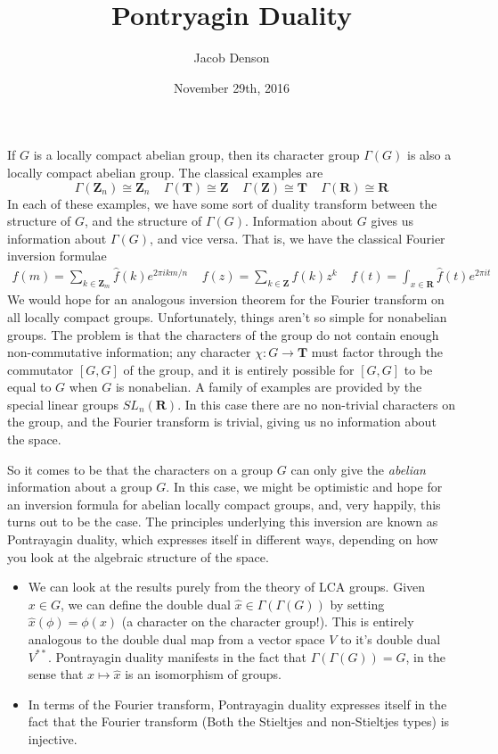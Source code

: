 \documentclass{article}
\title{Pontryagin Duality}
\author{Jacob Denson}
\date{November 29th, 2016}
\theoremstyle{plain}
\theoremstyle{definition}
\begin{document}
\maketitle

If $G$ is a locally compact abelian group, then its character group $\Gamma(G)$ is also a locally compact abelian group. The classical examples are
%
\[ \Gamma(\mathbf{Z}_n) \cong \mathbf{Z}_n\ \ \ \ \ \Gamma(\mathbf{T}) \cong \mathbf{Z}\ \ \ \ \ \Gamma(\mathbf{Z}) \cong \mathbf{T}\ \ \ \ \ \Gamma(\mathbf{R}) \cong \mathbf{R} \]
%
In each of these examples, we have some sort of duality transform between the structure of $G$, and the structure of $\Gamma(G)$. Information about $G$ gives us information about $\Gamma(G)$, and vice versa. That is, we have the classical Fourier inversion formulae
%
\begin{align*}
    f(m) = \sum_{k \in \mathbf{Z}_m} \widehat{f}(k) e^{2 \pi i km/n}\ \ \ \ \ f(z) = \sum_{k \in \mathbf{Z}} \widehat{f}(k) z^k\ \ \ \ \ f(t) = \int_{x \in \mathbf{R}} \widehat{f}(t) e^{2 \pi i t}
\end{align*}
%
We would hope for an analogous inversion theorem for the Fourier transform on all locally compact groups. Unfortunately, things aren't so simple for nonabelian groups. The problem is that the characters of the group do not contain enough non-commutative information; any character $\chi: G \to \mathbf{T}$ must factor through the commutator $[G,G]$ of the group, and it is entirely possible for $[G,G]$ to be equal to $G$ when $G$ is nonabelian. A family of examples are provided by the special linear groups $SL_n(\mathbf{R})$. In this case there are no non-trivial characters on the group, and the Fourier transform is trivial, giving us no information about the space.

So it comes to be that the characters on a group $G$ can only give the {\it abelian} information about a group $G$. In this case, we might be optimistic and hope for an inversion formula for abelian locally compact groups, and, very happily, this turns out to be the case. The principles underlying this inversion are known as Pontrayagin duality, which expresses itself in different ways, depending on how you look at the algebraic structure of the space.
%
\begin{itemize}
    \item We can look at the results purely from the theory of LCA groups. Given $x \in G$, we can define the double dual $\widehat{x} \in \Gamma(\Gamma(G))$ by setting $\widehat{x}(\phi) = \phi(x)$ (a character on the character group!). This is entirely analogous to the double dual map from a vector space $V$ to it's double dual $V^{**}$. Pontrayagin duality manifests in the fact that $\Gamma(\Gamma(G)) = G$, in the sense that $x \mapsto \widehat{x}$ is an isomorphism of groups.
    \item In terms of the Fourier transform, Pontrayagin duality expresses itself in the fact that the Fourier transform (Both the Stieltjes and non-Stieltjes types) is injective.
\end{itemize}
\end{document}
